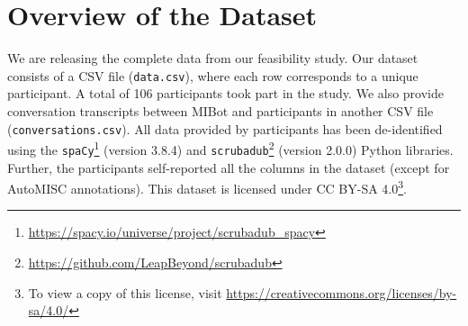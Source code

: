\chapter{Overview of the Dataset}
\label{appendix:dataset_overview}

We are releasing the complete data from our feasibility study. Our dataset consists of a CSV file (\texttt{data.csv}), where each row corresponds to a unique participant. A total of 106 participants took part in the study. We also provide conversation transcripts between MIBot and participants in another CSV file (\texttt{conversations.csv}). All data provided by participants has been de-identified using the \texttt{spaCy}\footnote{\url{https://spacy.io/universe/project/scrubadub_spacy}} (version 3.8.4)
and \texttt{scrubadub}\footnote{\url{https://github.com/LeapBeyond/scrubadub}} (version 2.0.0) Python libraries. Further, the participants self-reported all the columns in the dataset (except for AutoMISC annotations). This dataset is licensed under CC BY-SA 4.0\footnote{To view a copy of this license, visit \url{https://creativecommons.org/licenses/by-sa/4.0/}}.


